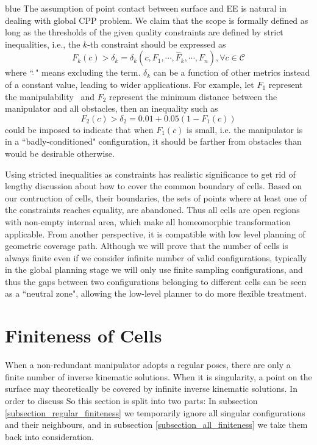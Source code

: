 \documentclass[Afour,sageh,times]{sagej}
\begin{document}
\begin{color}{blue}
The assumption of point contact between surface and EE is natural in dealing with global CPP problem. 
We claim that the scope is formally defined as long as the thresholds of the given quality constraints are defined by strict inequalities, i.e., the $k$-th constraint should be expressed as
\begin{equation}\label{equ_strict}
F_k(c) > \delta_k = \delta_k(c, F_1, \cdots, \hat{F}_k, \cdots, F_{n}), \forall c\in \mathscr{C}
\end{equation} 
where ``$\hat{\ }$" means excluding the term. $\delta_k$ can be a function of other metrics instead of a constant value, leading to wider applications. 
For example, let $F_1$ represent the manipulability~\cite{yoshikawa1990translational} 
and $F_2$ represent the minimum distance between the manipulator and all obstacles, then an inequality such as
\begin{equation}
F_2(c) > \delta_2 = 0.01+0.05(1-F_1(c))
\end{equation}
could be imposed to indicate that when $F_1(c)$ is small, i.e. the manipulator is in a ``badly-conditioned" configuration, it should be farther from obstacles than would be desirable otherwise. 


Using stricted inequalities as constraints has realistic significance to get rid of lengthy discussion about how to cover the common boundary of cells. Based on our contruction of cells, their boundaries, the sets of points where at least one of the constraints reaches equality, are abandoned. Thus all cells are open regions with non-empty internal area, which make all homeomorphic transformation applicable. 
From another perspective, it is compatible with low level planning of geometric coverage path. Although we will prove that the number of cells is always finite even if we consider infinite number of valid configurations, typically in the global planning stage we will only use finite sampling configurations, and thus the gaps between two configurations belonging to different cells can be seen as a ``neutral zone", allowing the low-level planner to do more flexible treatment. 
\end{color}




\section{Finiteness of Cells}
\label{section_finiteness_of_cells}
When a non-redundant manipulator adopts a regular poses, there are only a finite number of inverse kinematic solutions. When it is singularity, a point on the surface may theoretically be covered by infinite inverse kinematic solutions. In order to discuss So this section is split into two parts: In subsection \ref{subsection_regular_finiteness} we temporarily ignore all singular configurations and their neighbours, and in subsection \ref{subsection_all_finiteness} we take them back into consideration. 
\end{document}

